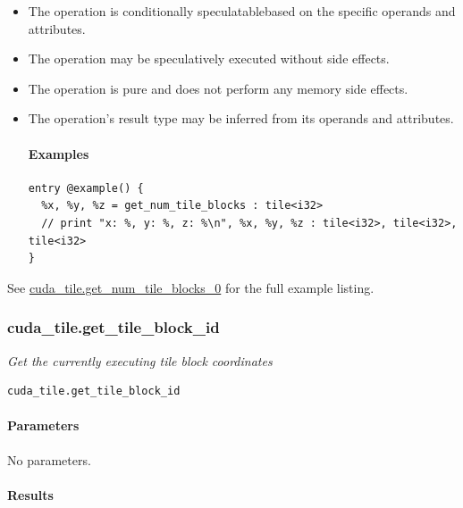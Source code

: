 \documentclass{article}
\begin{document}
\begin{itemize}
\item The operation is conditionally speculatablebased on the specific operands and attributes.
\item The operation may be speculatively executed without side effects.
\item The operation is pure and does not perform any memory side effects.
\item The operation's result type may be inferred from its operands and attributes.


\paragraph{Examples}

\begin{lstlisting}
entry @example() {
  %x, %y, %z = get_num_tile_blocks : tile<i32>
  // print "x: %, y: %, z: %\n", %x, %y, %z : tile<i32>, tile<i32>, tile<i32>
}
\end{lstlisting}

\end{itemize}
See \href{https://docs.nvidia.com/cuda/tile-ir/latest/sections/appendix.html#example-cuda-tile-get-num-tile-blocks-0}{cuda\_tile.get\_num\_tile\_blocks\_0} for the full example listing.



\subsubsection{cuda\_tile.get\_tile\_block\_id}

\textit{Get the currently executing tile block coordinates}


\begin{lstlisting}
cuda_tile.get_tile_block_id
\end{lstlisting}

\paragraph{Parameters}

No parameters.



\paragraph{Results}
\end{document}
